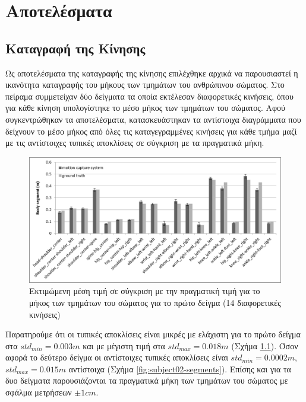 \chapter{Αποτελέσματα}

\section{Καταγραφή της Κίνησης}

Ως αποτελέσματα της καταγραφής της κίνησης επιλέχθηκε αρχικά να παρουσιαστεί η ικανότητα καταγραφής του μήκους των τμημάτων του ανθρώπινου σώματος. Στο πείραμα συμμετείχαν δύο δείγματα τα οποία εκτέλεσαν διαφορετικές κινήσεις, όπου για κάθε κίνηση υπολογίστηκε το μέσο μήκος των τμημάτων του σώματος. Αφού συγκεντρώθηκαν τα αποτελέσματα, κατασκευάστηκαν τα αντίστοιχα διαγράμματα που δείχνουν το μέσο μήκος από όλες τις καταγεγραμμένες κινήσεις για κάθε τμήμα μαζί με τις αντίστοιχες τυπικές αποκλίσεις σε σύγκριση με τα πραγματικά μήκη.

\begin{figure}[H]
    \centering
    \includegraphics[width=.8\textwidth]{fig/subject01-segments.png}
    \caption{Εκτιμώμενη μέση τιμή σε σύγκριση με την πραγματική τιμή για το μήκος των τμημάτων του σώματος για το πρώτο δείγμα (14 διαφορετικές κινήσεις)}
    \label{fig:subject01-segments}
\end{figure}

Παρατηρούμε ότι οι τυπικές αποκλίσεις είναι μικρές με ελάχιστη για το πρώτο δείγμα στα $std_{min} = 0.003m$ και με μέγιστη τιμή στα $std_{max} = 0.018m$ (Σχήμα \ref{fig:subject01-segments}). Όσον αφορά το δεύτερο δείγμα οι αντίστοιχες τυπικές αποκλίσεις είναι $std_{min} = 0.0002m$, $std_{max} = 0.015m$ αντίστοιχα (Σχήμα \ref{fig:subject02-segments}). Επίσης και για τα δυο δείγματα παρουσιάζονται τα πραγματικά μήκη των τμημάτων του σώματος με σφάλμα μετρήσεων $\pm 1cm$.

